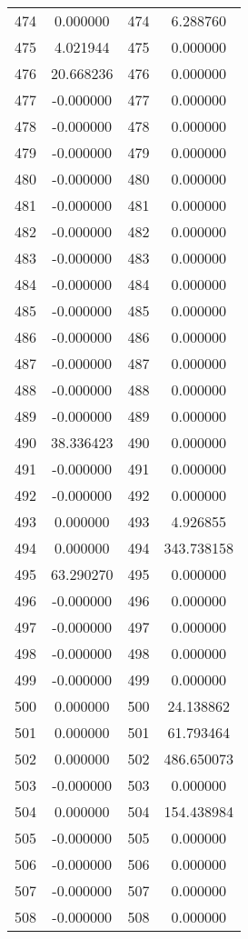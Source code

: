 \documentclass[12pt]{article}
\begin{document}
\begin{longtable}{@{}cccc@{}}
474 & 0.000000 & 474 & 6.288760 \\
475 & 4.021944 & 475 & 0.000000 \\
476 & 20.668236 & 476 & 0.000000 \\
477 & -0.000000 & 477 & 0.000000 \\
478 & -0.000000 & 478 & 0.000000 \\
479 & -0.000000 & 479 & 0.000000 \\
480 & -0.000000 & 480 & 0.000000 \\
481 & -0.000000 & 481 & 0.000000 \\
482 & -0.000000 & 482 & 0.000000 \\
483 & -0.000000 & 483 & 0.000000 \\
484 & -0.000000 & 484 & 0.000000 \\
485 & -0.000000 & 485 & 0.000000 \\
486 & -0.000000 & 486 & 0.000000 \\
487 & -0.000000 & 487 & 0.000000 \\
488 & -0.000000 & 488 & 0.000000 \\
489 & -0.000000 & 489 & 0.000000 \\
490 & 38.336423 & 490 & 0.000000 \\
491 & -0.000000 & 491 & 0.000000 \\
492 & -0.000000 & 492 & 0.000000 \\
493 & 0.000000 & 493 & 4.926855 \\
494 & 0.000000 & 494 & 343.738158 \\
495 & 63.290270 & 495 & 0.000000 \\
496 & -0.000000 & 496 & 0.000000 \\
497 & -0.000000 & 497 & 0.000000 \\
498 & -0.000000 & 498 & 0.000000 \\
499 & -0.000000 & 499 & 0.000000 \\
500 & 0.000000 & 500 & 24.138862 \\
501 & 0.000000 & 501 & 61.793464 \\
502 & 0.000000 & 502 & 486.650073 \\
503 & -0.000000 & 503 & 0.000000 \\
504 & 0.000000 & 504 & 154.438984 \\
505 & -0.000000 & 505 & 0.000000 \\
506 & -0.000000 & 506 & 0.000000 \\
507 & -0.000000 & 507 & 0.000000 \\
508 & -0.000000 & 508 & 0.000000 \\

\end{longtable}
\end{document}
